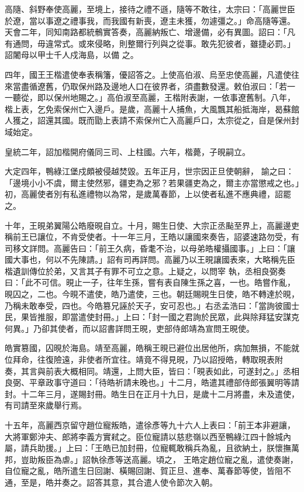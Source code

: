 \begin{pinyinscope}
 高隨、斜野奉使高麗，至境上，接待之禮不遜，隨等不敢往，太宗曰：「高麗世臣於遼，當以事遼之禮事我，而我國有新喪，遼主未獲，勿遽彊之。」命高隨等還。天會二年，同知南路都統鶻實答奏，高麗納叛亡、增邊備，必有異圖。詔曰：「凡有通問，毋違常式。或來侵略，則整爾行列與之從事。敢先犯彼者，雖捷必罰。」詔闍母以甲士千人戍海島，以備
 之。



 四年，國王王楷遣使奉表稱籓，優詔答之。上使高伯淑、烏至忠使高麗，凡遣使往來當盡循遼舊，仍取保州路及邊地人口在彼界者，須盡數發還。敕伯淑曰：「若一一聽從，即以保州地賜之。」高伯淑至高麗，王楷附表謝，一依事遼舊制。八年，楷上表，乞免索保州亡入邊戶。是歲，高麗十人捕魚，大風飄其船抵海岸，曷蘇館人獲之，詔還其國。既而勖上表請不索保州亡入高麗戶口，太宗從之，自是保州封域始定。



 皇統二年，詔加楷開府儀同三司、上柱國。六年，楷薨，子晛嗣立。



 大定四年，鴨綠江堡戍頗被侵越焚毀。五年正月，世宗因正旦使朝辭，
 諭之曰：「邊境小小不虞，爾主使然邪，疆吏為之邪？若果疆吏為之，爾主亦當懲戒之也。」初，高麗使者別有私進禮物以為常，是歲萬春節，上以使者私進不應典禮，詔罷之。



 十年，王晛弟翼陽公皓廢晛自立。十月，賜生日使、大宗正丞颭至界上，高麗邊吏稱前王已讓位，不肯受使者。十一年三月，王皓以讓國來奏告，詔婆速路勿受，有司移文詳問。高麗告曰：「前王久病，昏耄不治，以母弟皓權攝國事。」上曰：「讓國大事也，何以不先陳請。」詔有司再詳問。高麗乃以王晛讓國表來，大略稱先臣楷遺訓傳位於弟，又言其子有罪不可立之意。上疑之，以問宰
 執，丞相良弼奏曰：「此不可信。晛止一子，往年生孫，嘗有表自陳生孫之喜，一也。皓嘗作亂，晛囚之，二也。今晛不遣使，皓乃遣使，三也。朝廷賜晛生日使，皓不轉達於晛，乃稱未敢奉受，四也。今皓篡兄誣於天子，安可忍也。」右丞孟浩曰：「當詢彼國士民，果皆推服，即當遣使封冊。」上曰：「封一國之君詢於民眾，此與除拜猛安謀克何異。」乃卻其使者，而以詔書詳問王晛，吏部侍郎靖為宣問王晛使。



 皓實篡國，囚晛於海島。靖至高麗，皓稱王晛已避位出居他所，病加無損，不能就位拜命，往復險遠，非使者所宜往。靖竟不得見晛，乃以詔授皓，轉取晛表附
 奏，其言與前表大概相同。靖還，上問大臣，皆曰：「晛表如此，可遂封之。」丞相良弼、平章政事守道曰：「待皓祈請未晚也。」十二月，皓遣其禮部侍郎張翼明等請封。十二年三月，遂賜封冊。皓生日在正月十九日，是歲十二月將盡，未及遣使，有司請至來歲舉行焉。



 十五年，高麗西京留守趙位寵叛皓，遣徐彥等九十六人上表曰：「前王本非避讓，大將軍鄭沖夫、郎將李義方實弒之。臣位寵請以慈悲嶺以西至鴨綠江四十餘城內屬，請兵助援。」上曰：「王皓已加封冊，位寵輒敢稱兵為亂，且欲納土，朕懷撫萬邦，豈助叛臣為虐。」詔執徐彥等送高麗。頃之，
 王皓定趙位寵之亂，遣使奏謝，自位寵之亂，皓所遣生日回謝、橫賜回謝、賀正旦、進奉、萬春節等使，皆阻不通，至是，皓并奏之。詔答其意，其合遣人使令節次入朝。




\end{pinyinscope}

